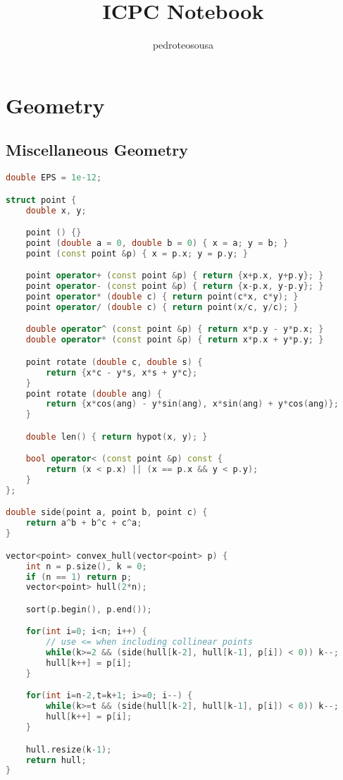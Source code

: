 \documentclass{article}
\title{ICPC Notebook}
\author{pedroteosousa }
\date{}
\begin{document}
\maketitle
\tableofcontents

\section{Geometry}
\subsection{Miscellaneous Geometry}
\begin{lstlisting}[language=C++]
double EPS = 1e-12;

struct point {
	double x, y;

	point () {}
	point (double a = 0, double b = 0) { x = a; y = b; }
	point (const point &p) { x = p.x; y = p.y; }

	point operator+ (const point &p) { return {x+p.x, y+p.y}; }
	point operator- (const point &p) { return {x-p.x, y-p.y}; }
	point operator* (double c) { return point(c*x, c*y); }
	point operator/ (double c) { return point(x/c, y/c); }

	double operator^ (const point &p) { return x*p.y - y*p.x; }
	double operator* (const point &p) { return x*p.x + y*p.y; }

	point rotate (double c, double s) {
		return {x*c - y*s, x*s + y*c}; 
	}
	point rotate (double ang) {
		return {x*cos(ang) - y*sin(ang), x*sin(ang) + y*cos(ang)};
	}

	double len() { return hypot(x, y); }

	bool operator< (const point &p) const {
		return (x < p.x) || (x == p.x && y < p.y);
	}
};

double side(point a, point b, point c) {
	return a^b + b^c + c^a;
}

vector<point> convex_hull(vector<point> p) {
	int n = p.size(), k = 0;
	if (n == 1) return p;
	vector<point> hull(2*n);

	sort(p.begin(), p.end());

	for(int i=0; i<n; i++) {
		// use <= when including collinear points
		while(k>=2 && (side(hull[k-2], hull[k-1], p[i]) < 0)) k--;
		hull[k++] = p[i];
	}

	for(int i=n-2,t=k+1; i>=0; i--) {
		while(k>=t && (side(hull[k-2], hull[k-1], p[i]) < 0)) k--;
		hull[k++] = p[i];
	}

	hull.resize(k-1);
	return hull;
}
\end{lstlisting}
\end{document}
